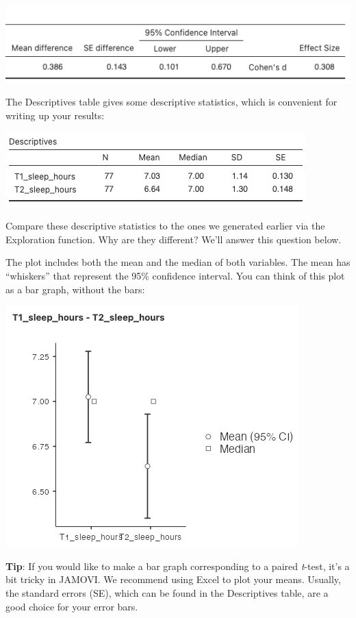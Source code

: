 \documentclass[
]{book}
\begin{document}
\includegraphics{img/pairedttestoutput_2.png}

The Descriptives table gives some descriptive statistics, which is convenient for writing up your results:

\includegraphics{img/paireddescriptives.png}

Compare these descriptive statistics to the ones we generated earlier via the Exploration function. Why are they different? We'll answer this question below.

The plot includes both the mean and the median of both variables. The mean has ``whiskers'' that represent the 95\% confidence interval. You can think of this plot as a bar graph, without the bars:

\includegraphics{img/pairedplot.png}

\textbf{Tip}: If you would like to make a bar graph corresponding to a paired \emph{t}-test, it's a bit tricky in JAMOVI. We recommend using Excel to plot your means. Usually, the standard errors (SE), which can be found in the Descriptives table, are a good choice for your error bars.
\end{document}
